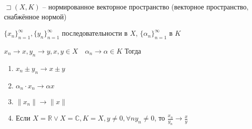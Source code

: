 \documentclass{book}
\newcommand\R{\ensuremath{\mathbb{R}}}
\renewcommand\C{\ensuremath{\mathbb{C}}}
\theoremstyle{definition}
\begin{document}
    \begin{theorem}
        $\sqsupset (X,K)$ -- нормированное векторное пространство (векторное пространство, снабжённое нормой)

        $\{x_n\}_{n=1}^{\infty }, \{y_n\}_{n=1}^{\infty }$ последовательности в $X$, $\{\alpha_n\}_{n=1}^{\infty }$ в $K$

        $x_{n} \to x, y_{n} \to y, x, y\in X\quad \alpha_n\to \alpha\in K$
        Тогда 
        \begin{enumerate}
            \item $x_{n} \pm y_{n} \to  x\pm y$
            \item $\alpha_n\cdot x_n \to \alpha x$
            \item $\|x_n\| \to  \|x\|$
            \item Если $X = \R \lor X = \C, K=X, y\neq 0, \forall n y_{n} \neq 0$, то $\frac{x_{n} }{y_{n} } \to \frac{x}{y}$
        \end{enumerate}
    \end{theorem}
\end{document}
